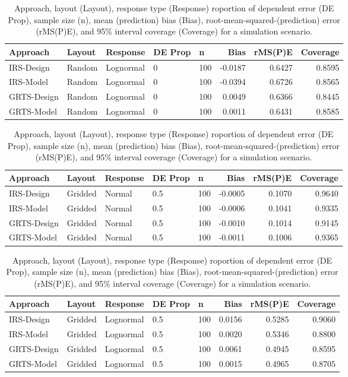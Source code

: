 \documentclass[]{elsarticle} %
\begin{document}
\begin{table}[ht]
\centering
\begin{tabular}{lllllrrr}
  \hline
Approach & Layout & Response & DE Prop & n & Bias & rMS(P)E & Coverage \\ 
  \hline
IRS-Design & Random & Lognormal & 0 & 100 & -0.0187 & 0.6427 & 0.8595 \\ 
  IRS-Model & Random & Lognormal & 0 & 100 & -0.0394 & 0.6726 & 0.8565 \\ 
  GRTS-Design & Random & Lognormal & 0 & 100 & 0.0049 & 0.6366 & 0.8445 \\ 
  GRTS-Model & Random & Lognormal & 0 & 100 & 0.0011 & 0.6431 & 0.8585 \\ 
   \hline
\end{tabular}
\caption{Approach, layout (Layout), response type (Response) roportion of dependent error (DE Prop), sample size (n), mean (prediction) bias (Bias), root-mean-squared-(prediction) error (rMS(P)E), and 95\% interval coverage (Coverage) for a simulation scenario.} 
\end{table}
\begin{table}[ht]
\centering
\begin{tabular}{lllllrrr}
  \hline
Approach & Layout & Response & DE Prop & n & Bias & rMS(P)E & Coverage \\ 
  \hline
IRS-Design & Gridded & Normal & 0.5 & 100 & -0.0005 & 0.1070 & 0.9640 \\ 
  IRS-Model & Gridded & Normal & 0.5 & 100 & -0.0006 & 0.1041 & 0.9335 \\ 
  GRTS-Design & Gridded & Normal & 0.5 & 100 & -0.0010 & 0.1014 & 0.9145 \\ 
  GRTS-Model & Gridded & Normal & 0.5 & 100 & -0.0011 & 0.1006 & 0.9365 \\ 
   \hline
\end{tabular}
\caption{Approach, layout (Layout), response type (Response) roportion of dependent error (DE Prop), sample size (n), mean (prediction) bias (Bias), root-mean-squared-(prediction) error (rMS(P)E), and 95\% interval coverage (Coverage) for a simulation scenario.} 
\end{table}
\begin{table}[ht]
\centering
\begin{tabular}{lllllrrr}
  \hline
Approach & Layout & Response & DE Prop & n & Bias & rMS(P)E & Coverage \\ 
  \hline
IRS-Design & Gridded & Lognormal & 0.5 & 100 & 0.0156 & 0.5285 & 0.9060 \\ 
  IRS-Model & Gridded & Lognormal & 0.5 & 100 & 0.0020 & 0.5346 & 0.8800 \\ 
  GRTS-Design & Gridded & Lognormal & 0.5 & 100 & 0.0061 & 0.4945 & 0.8595 \\ 
  GRTS-Model & Gridded & Lognormal & 0.5 & 100 & 0.0015 & 0.4965 & 0.8705 \\ 
   \hline
\end{tabular}
\caption{Approach, layout (Layout), response type (Response) roportion of dependent error (DE Prop), sample size (n), mean (prediction) bias (Bias), root-mean-squared-(prediction) error (rMS(P)E), and 95\% interval coverage (Coverage) for a simulation scenario.} 
\end{table}
\end{document}
